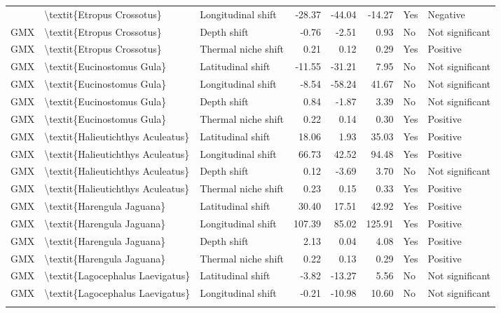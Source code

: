 \begin{longtable}[t]{lllrrrll}
{{GMX & \textbackslash{}textit\{Etropus Crossotus\} & Longitudinal shift & -28.37 & -44.04 & -14.27 & Yes & Negative\\
GMX & \textbackslash{}textit\{Etropus Crossotus\} & Depth shift & -0.76 & -2.51 & 0.93 & No & Not significant\\
GMX & \textbackslash{}textit\{Etropus Crossotus\} & Thermal niche shift & 0.21 & 0.12 & 0.29 & Yes & Positive\\
\addlinespace
GMX & \textbackslash{}textit\{Eucinostomus Gula\} & Latitudinal shift & -11.55 & -31.21 & 7.95 & No & Not significant\\
GMX & \textbackslash{}textit\{Eucinostomus Gula\} & Longitudinal shift & -8.54 & -58.24 & 41.67 & No & Not significant\\
GMX & \textbackslash{}textit\{Eucinostomus Gula\} & Depth shift & 0.84 & -1.87 & 3.39 & No & Not significant\\
GMX & \textbackslash{}textit\{Eucinostomus Gula\} & Thermal niche shift & 0.22 & 0.14 & 0.30 & Yes & Positive\\
GMX & \textbackslash{}textit\{Halieutichthys Aculeatus\} & Latitudinal shift & 18.06 & 1.93 & 35.03 & Yes & Positive\\
\addlinespace
GMX & \textbackslash{}textit\{Halieutichthys Aculeatus\} & Longitudinal shift & 66.73 & 42.52 & 94.48 & Yes & Positive\\
GMX & \textbackslash{}textit\{Halieutichthys Aculeatus\} & Depth shift & 0.12 & -3.69 & 3.70 & No & Not significant\\
GMX & \textbackslash{}textit\{Halieutichthys Aculeatus\} & Thermal niche shift & 0.23 & 0.15 & 0.33 & Yes & Positive\\
GMX & \textbackslash{}textit\{Harengula Jaguana\} & Latitudinal shift & 30.40 & 17.51 & 42.92 & Yes & Positive\\
GMX & \textbackslash{}textit\{Harengula Jaguana\} & Longitudinal shift & 107.39 & 85.02 & 125.91 & Yes & Positive\\
\addlinespace
GMX & \textbackslash{}textit\{Harengula Jaguana\} & Depth shift & 2.13 & 0.04 & 4.08 & Yes & Positive\\
GMX & \textbackslash{}textit\{Harengula Jaguana\} & Thermal niche shift & 0.22 & 0.13 & 0.29 & Yes & Positive\\
GMX & \textbackslash{}textit\{Lagocephalus Laevigatus\} & Latitudinal shift & -3.82 & -13.27 & 5.56 & No & Not significant\\
GMX & \textbackslash{}textit\{Lagocephalus Laevigatus\} & Longitudinal shift & -0.21 & -10.98 & 10.60 & No & Not significant\\
}}
\end{longtable}
